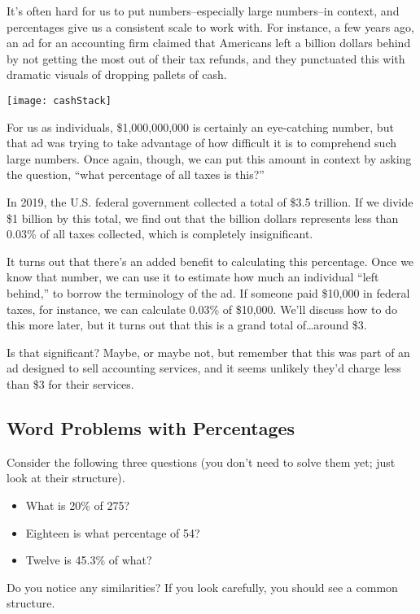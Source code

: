 It's often hard for us to put numbers--especially large numbers--in context, and percentages give us a consistent scale to work with.  For instance, a few years ago, an ad for an accounting firm claimed that Americans left a billion dollars behind by not getting the most out of their tax refunds, and they punctuated this with dramatic visuals of dropping pallets of cash.

\begin{center}
\texttt{[image: cashStack]}
\end{center}

For us as individuals, \$1,000,000,000 is certainly an eye-catching number, but that ad was trying to take advantage of how difficult it is to comprehend such large numbers.  Once again, though, we can put this amount in context by asking the question, ``what percentage of all taxes is this?''

In 2019, the U.S. federal government collected a total of \$3.5 trillion.  If we divide \$1 billion by this total, we find out that the billion dollars represents less than 0.03\% of all taxes collected, which is completely insignificant.

It turns out that there's an added benefit to calculating this percentage.  Once we know that number, we can use it to estimate how much an individual ``left behind,'' to borrow the terminology of the ad.  If someone paid \$10,000 in federal taxes, for instance, we can calculate 0.03\% of \$10,000.  We'll discuss how to do this more later, but it turns out that this is a grand total of\ldots around \$3.

Is that significant?  Maybe, or maybe not, but remember that this was part of an ad designed to sell accounting services, and it seems unlikely they'd charge less than \$3 for their services.

\subsection{Word Problems with Percentages}
Consider the following three questions (you don't need to solve them yet; just look at their structure).
\begin{itemize}
\item What is 20\% of 275?
\item Eighteen is what percentage of 54?
\item Twelve is 45.3\% of what?
\end{itemize}

Do you notice any similarities?  If you look carefully, you should see a common structure.

